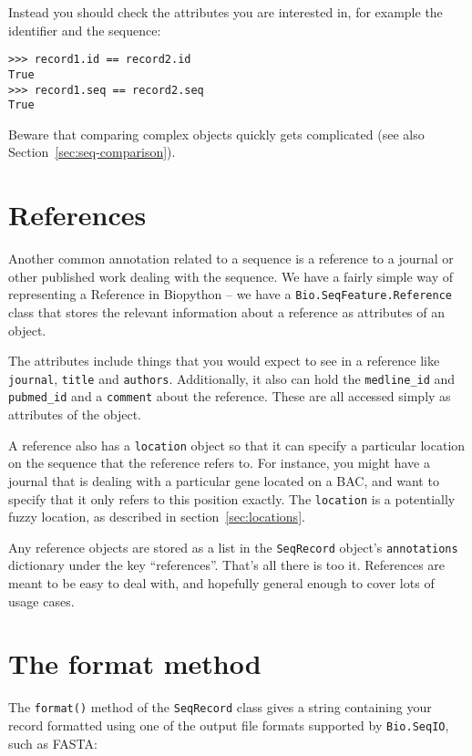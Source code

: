 Instead you should check the attributes you are interested in, for example the
identifier and the sequence:

\begin{verbatim}
>>> record1.id == record2.id
True
>>> record1.seq == record2.seq
True
\end{verbatim}

Beware that comparing complex objects quickly gets complicated (see also
Section~\ref{sec:seq-comparison}).

\section{References}

Another common annotation related to a sequence is a reference to a journal or other published work dealing with the sequence. We have a fairly simple way of representing a Reference in Biopython -- we have a \verb|Bio.SeqFeature.Reference| class that stores the relevant information about a reference as attributes of an object.

The attributes include things that you would expect to see in a reference like \verb|journal|, \verb|title| and \verb|authors|. Additionally, it also can hold the \verb|medline_id| and \verb|pubmed_id| and a \verb|comment| about the reference. These are all accessed simply as attributes of the object.

A reference also has a \verb|location| object so that it can specify a particular location on the sequence that the reference refers to. For instance, you might have a journal that is dealing with a particular gene located on a BAC, and want to specify that it only refers to this position exactly. The \verb|location| is a potentially fuzzy location, as described in section~\ref{sec:locations}.

Any reference objects are stored as a list in the \verb|SeqRecord| object's \verb|annotations| dictionary under the key ``references''.
That's all there is too it. References are meant to be easy to deal with, and hopefully general enough to cover lots of usage cases.

\section{The format method}
\label{sec:SeqRecord-format}

The \verb|format()| method of the \verb|SeqRecord| class gives a string
containing your record formatted using one of the output file formats
supported by \verb|Bio.SeqIO|, such as FASTA:

